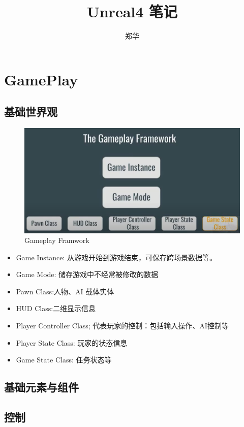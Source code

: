 \documentclass[UTF8,a4paper,12pt]{ctexbook}
\author{\kaishu 郑华}
\title{\heiti Unreal4 笔记}
\begin{document}
 	\maketitle
 	\tableofcontents


\chapter{GamePlay}
	\section{基础世界观}
		\begin{figure}[H]
			\centering
			\includegraphics[width=\linewidth]{Base}
			\caption{Gameplay Framwork}
		\end{figure}
		
		\begin{itemize}
			\item Game Instance: 从游戏开始到游戏结束，可保存跨场景数据等。
			\item Game Mode: 储存游戏中不经常被修改的数据
			\item Pawn Class:人物、AI 载体实体
			\item HUD Class:二维显示信息
			\item Player Controller Class; 代表玩家的控制：包括输入操作、AI控制等
			\item Player State Class: 玩家的状态信息
			\item Game State Class: 任务状态等
		\end{itemize}
		
	\section{基础元素与组件}
	
	\section{控制}
	
\end{document}
